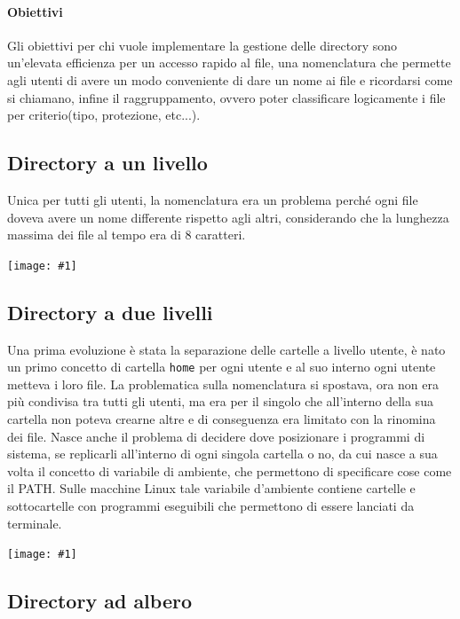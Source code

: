 \documentclass[a4paper, 12pt]{book}
\newcommand{\foto}[1]{\texttt{[image: \#1]}}
\begin{document}
\paragraph{Obiettivi}Gli obiettivi per chi vuole implementare la gestione delle 
directory sono un'elevata efficienza per un accesso rapido al 
file, una nomenclatura che permette agli utenti di 
avere un modo conveniente di dare un nome ai file e
ricordarsi come si chiamano, infine il raggruppamento, ovvero
poter classificare logicamente i file per criterio(tipo, 
protezione, etc...).

\subsection{Directory a un livello}

Unica per tutti gli utenti, la nomenclatura era un problema 
perché ogni file doveva avere un nome differente rispetto 
agli altri, considerando che la lunghezza massima dei file 
al tempo era di 8 caratteri.
\begin{center}
    \foto{mono_dir.png}
\end{center}

\subsection{Directory a due livelli}

Una prima evoluzione è stata la separazione delle cartelle 
a livello utente, è nato un primo concetto di cartella \verb|home|
per ogni utente e al suo interno ogni utente metteva i loro file.
La problematica sulla nomenclatura si spostava, ora non era più condivisa tra 
tutti gli utenti, ma era per il singolo che all'interno della sua
cartella non poteva crearne altre e di conseguenza era limitato 
con la rinomina dei file. Nasce anche il problema di decidere 
dove posizionare i programmi di sistema, se replicarli 
all'interno di ogni singola cartella o no, da cui nasce a 
sua volta il concetto di variabile di ambiente, che permettono di 
specificare cose come il PATH. Sulle macchine Linux 
tale variabile d'ambiente contiene cartelle e sottocartelle 
con programmi eseguibili che permettono di essere lanciati da terminale.
\begin{center}
    \foto{bi_dir.png}
\end{center}

\subsection{Directory ad albero}
\end{document}
